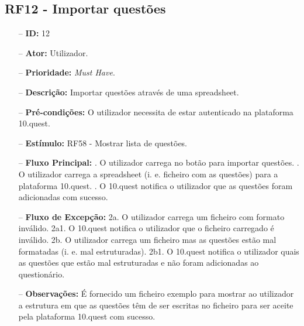 \subsection{RF12 - Importar questões}
\begin{itemize}
	\item[--] \textbf{ID:} 12
	\item[--]  \textbf{Ator:} Utilizador.
	\item[--]  \textbf{Prioridade:} \textit{Must Have}.
	\item[--]  \textbf{Descrição:} Importar questões através de uma spreadsheet. 
	\item[--]  \textbf{Pré-condições:} O utilizador necessita de estar autenticado na plataforma 10.quest.
	\item[--]  \textbf{Estímulo:}  
		\subitem RF58 - Mostrar lista de questões.
	\item[--]  \textbf{Fluxo Principal:} 
		. O utilizador carrega no botão para importar questões.
		. O utilizador carrega a spreadsheet (i. e. ficheiro com as questões) para a plataforma 10.quest.
		. O 10.quest notifica o utilizador que as questões foram adicionadas com sucesso.
	\item[--]  \textbf{Fluxo de Excepção:} 
		\subitem 2a. O utilizador carrega um ficheiro com formato inválido.
		\subitem 2a1. O 10.quest notifica o utilizador que o ficheiro carregado é inválido.
		\subitem 2b. O utilizador carrega um ficheiro mas as questões estão mal formatadas (i. e. mal estruturadas).
		\subitem 2b1. O 10.quest notifica o utilizador quais as questões que estão mal estruturadas e não foram adicionadas ao questionário.
	\item[--]  \textbf{Observações:} É fornecido um ficheiro exemplo para mostrar ao utilizador a estrutura em que as questões têm de ser escritas no ficheiro para ser aceite pela plataforma 10.quest com sucesso.
\end{itemize}
\newpage

